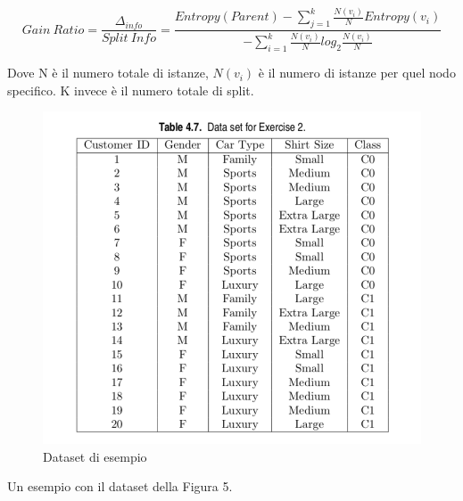 \documentclass[14pt]{extreport}
\begin{document}
\begin{equation}
    Gain\ Ratio = \frac{\Delta_{info}}{Split\ Info} = \frac{Entropy(Parent) - \sum\limits_{j=1}^{k} \frac {N(v_i)}{N} Entropy(v_i)}{- \sum\limits_{i=1}^{k} \frac{N(v_i)}{N} log_2 \frac {N(v_i)}{N}}
\end{equation}

Dove N è il numero totale di istanze, $N(v_i)$ è il numero di istanze per quel nodo specifico. K invece è il numero totale di split.

\begin{figure}[h!]
  \includegraphics[width=\linewidth]{DatasetMacchine.png}
  \caption{Dataset di esempio}
\end{figure}

Un esempio con il dataset della Figura 5.
\end{document}
